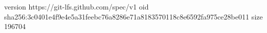 version https://git-lfs.github.com/spec/v1
oid sha256:3c0401e4f9e4e5a31feebc76a8286e71a8183570118c8e6592fa975ce28be011
size 196704
